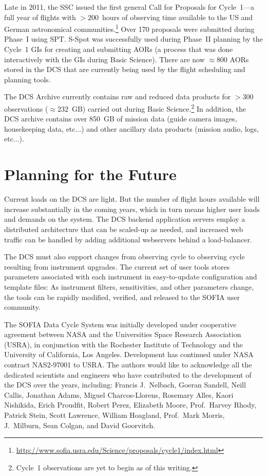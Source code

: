 Late in 2011, the SSC issued the first general Call for Proposals for Cycle~1---a full year of flights with $> 200$~hours of observing time available to the US and German astronomical communities.\footnote{
\url{http://www.sofia.usra.edu/Science/proposals/cycle1/index.html}}
Over 170 proposals were submitted during Phase~I using SPT.  S-Spot was successfully used during Phase~II planning by the Cycle~1 GIs for creating and submitting AORs (a process that was done interactively with the GIs during Basic Science).  There are now $\approx 800$ AORs  stored in the DCS that are currently being used by the flight scheduling and planning tools.


The DCS Archive currently contains raw and reduced data products for $> 300$ observations ($\approx 232$~GB) carried out during Basic Science.\footnote{
Cycle~1 observations are yet to begin as of this writing.}  
In addition, the DCS archive contains over 850~GB of mission data (guide camera images, housekeeping data, etc...) and other ancillary data products (mission audio, logs, etc...).  

\section{Planning for the Future}

Current loads on the DCS are light.  But the number of flight hours available will increase substantially in the coming years, which in turn means higher user loads and demands on the system.  The DCS backend application servers employ a distributed architecture that can be scaled-up as needed, and increased web traffic can be handled by adding additional webservers behind a load-balancer.  

The DCS must also support changes from observing cycle to observing cycle resulting from instrument upgrades.  The current set of user tools stores parameters associated with each instrument in easy-to-update configuration and template files:  As instrument filters, sensitivities, and other parameters change, the tools can be rapidly modified, verified, and released to the SOFIA user community.  


\acknowledgements 

The SOFIA Data Cycle System was initially developed under cooperative agreement between NASA and the Universities Space Research Association (USRA), in conjunction with the Rochester Institute of Technology and the University of California, Los Angeles. Development has continued under NASA contract NAS2-97001 to USRA. The authors would like to acknowledge  all the dedicated scientists and engineers who have contributed to the development of the DCS over the years, including:  Francis J.~Nelbach, 
Goeran Sandell, 
Neill Callis, 
Jonathan Adams, 
Miguel Charcos-Llorens, 
Rosemary Alles,
Kaori Nishikida,
Erich Proudfit, 
Robert Perez,
Elizabeth Moore,
Prof.~Harvey Rhody, 
Patrick Stein,
Scott Lawrence, 
William Hoagland,
Prof.~Mark Morris, 
J.~Milburn,
Sean Colgan,
and David Goorvitch.




